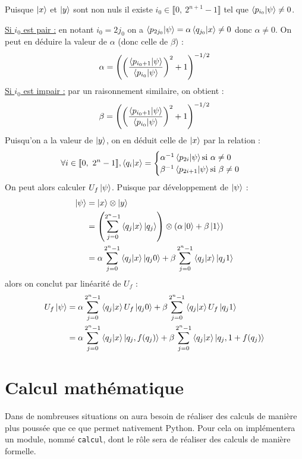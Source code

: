 \documentclass[french]{article}
\newcommand{\p}{\texttt} %
\newcommand{\somme}{\displaystyle\sum}
\newcommand{\entiers}[2]{\llbracket #1,\ #2\rrbracket} %
\begin{document}
Puisque $\ket x$ et $\ket y$ sont non nuls il existe $i_0 \in \entiers{0}{2^{n+1}-1}$ tel que $\bra{p_{i_0}} \ket{\psi} \not= 0$.


\noindent \underline{Si $i_0$ est pair :} en notant $i_0 = 2 j_0$ on a $\bra{p_{2 j_0}} \ket{\psi} = \alpha \bra{q_{j_0}} \ket{x} \not= 0$ donc $\alpha \not= 0$. On peut en déduire la valeur de $\alpha$ (donc celle de $\beta$) :
$$\alpha = {\left(
{\left(\frac
    {\bra{p_{i_0+1}} \ket{\psi}}
    {\bra{p_{i_0}} \ket{\psi}
}\right)}^2
+ 1
\right)}^{-1/2}$$
\underline{Si $i_0$ est impair :} par un raisonnement similaire, on obtient :
$$\beta = {\left(
{\left(\frac
    {\bra{p_{i_0+1}} \ket{\psi}}
    {\bra{p_{i_0}} \ket{\psi}
}\right)}^2
+ 1
\right)}^{-1/2}$$
Puisqu'on a la valeur de $\ket y$, on en déduit celle de $\ket x$ par la relation :
$$\forall i \in \entiers{0}{2^n - 1},
\bra{q_i} \ket{x} = \begin{cases}
\alpha^{-1} \bra{p_{2i}} \ket{\psi} \text{si } \alpha \not= 0 \\
\beta^{-1} \bra{p_{2i+1}} \ket{\psi} \text{si } \beta \not= 0 \\
\end{cases}$$
On peut alors calculer $U_f \ket \psi$. Puisque par développement de $\ket \psi$ :
\begin{align*}
\ket \psi &= \ket x \otimes \ket y \\
&= \left( \somme^{2^n-1}_{j=0} \bra{q_j}\ket{x}\ket{q_j} \right) \otimes (\alpha \ket 0 + \beta \ket 1) \\
&= \alpha \somme^{2^n-1}_{j=0} \bra{q_j}\ket{x}\ket{q_j0}
+ \beta \somme^{2^n-1}_{j=0} \bra{q_j}\ket{x}\ket{q_j1}
\end{align*}
alors on conclut par linéarité de $U_f$ :
\begin{align*}
U_f \ket \psi
&= \alpha \somme^{2^n-1}_{j=0} \bra{q_j} \ket{x} U_f \ket{q_j0}
+ \beta \somme^{2^n-1}_{j=0} \bra{q_j} \ket{x} U_f \ket{q_j1} \\
&= \alpha \somme^{2^n-1}_{j=0} \bra{q_j} \ket{x} \ket{q_j, f(q_j)}
+ \beta \somme^{2^n-1}_{j=0} \bra{q_j} \ket{x} \ket{q_j, 1 + f(q_j)} \\
\end{align*}

\section{Calcul mathématique}


Dans de nombreuses situations on aura besoin de réaliser des calculs de manière plus poussée que ce que permet nativement Python. Pour cela on implémentera un module, nommé \p{calcul}, dont le rôle sera de réaliser des calculs de manière formelle.
\end{document}
